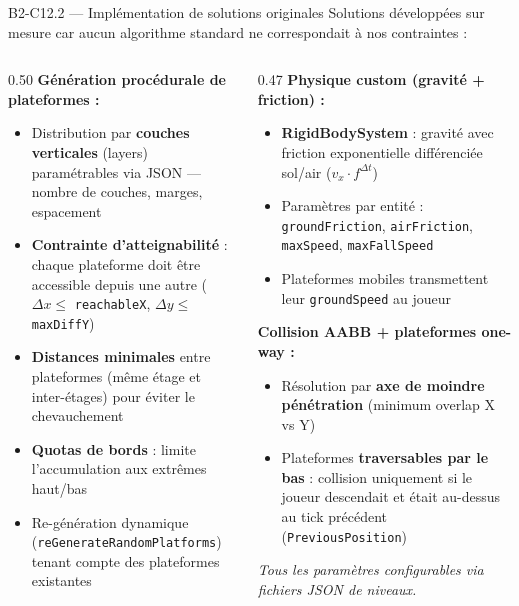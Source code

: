 \documentclass[aspectratio=169,10pt]{beamer}
\begin{document}
\begin{frame}{B2-C12.2 — Implémentation de solutions originales}
\footnotesize
Solutions développées sur mesure car aucun algorithme standard ne correspondait à nos contraintes :

\begin{columns}[T]
\begin{column}{0.50\textwidth}
\textbf{Génération procédurale de plateformes :}
\begin{itemize}\setlength\itemsep{1pt}
  \item Distribution par \textbf{couches verticales} (layers) paramétrables via JSON — nombre de couches, marges, espacement
  \item \textbf{Contrainte d'atteignabilité} : chaque plateforme doit être accessible depuis une autre ($\Delta x \leq$ \texttt{reachableX}, $\Delta y \leq$ \texttt{maxDiffY})
  \item \textbf{Distances minimales} entre plateformes (même étage et inter-étages) pour éviter le chevauchement
  \item \textbf{Quotas de bords} : limite l'accumulation aux extrêmes haut/bas
  \item Re-génération dynamique (\texttt{reGenerateRandomPlatforms}) tenant compte des plateformes existantes
\end{itemize}
\end{column}

\begin{column}{0.47\textwidth}
\textbf{Physique custom (gravité + friction) :}
\begin{itemize}\setlength\itemsep{1pt}
  \item \textbf{RigidBodySystem} : gravité avec friction exponentielle différenciée sol/air ($v_x \cdot f^{\Delta t}$)
  \item Paramètres par entité : \texttt{groundFriction}, \texttt{airFriction}, \texttt{maxSpeed}, \texttt{maxFallSpeed}
  \item Plateformes mobiles transmettent leur \texttt{groundSpeed} au joueur
\end{itemize}

\vspace{0.2em}
\textbf{Collision AABB + plateformes one-way :}
\begin{itemize}\setlength\itemsep{1pt}
  \item Résolution par \textbf{axe de moindre pénétration} (minimum overlap X vs Y)
  \item Plateformes \textbf{traversables par le bas} : collision uniquement si le joueur descendait et était au-dessus au tick précédent (\texttt{PreviousPosition})
\end{itemize}

\vspace{0.2em}
\textit{Tous les paramètres configurables via fichiers JSON de niveaux.}
\end{column}
\end{columns}
\end{frame}
\end{document}
